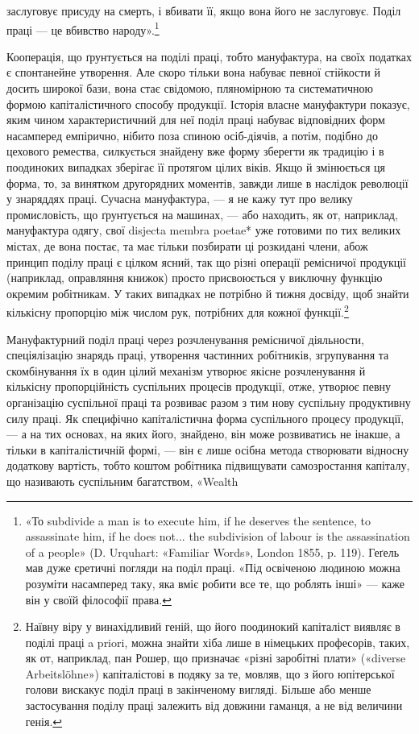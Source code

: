 \parcont{}  %
заслуговує присуду на смерть, і вбивати її, якщо вона його не
заслуговує. Поділ праці — це вбивство народу».\footnote{
«То subdivide a man is to execute him, if he deserves the sentence,
to assassinate him, if he does not... the subdivision of labour is the assassination
of a people» (D. Urquhart: «Familiar Words», London 1855,
p. 119). Геґель мав дуже єретичні погляди на поділ праці. «Під освіченою
людиною можна розуміти насамперед таку, яка вміє робити все
те, що роблять інші» — каже він у своїй філософії права.
}

Кооперація, що ґрунтується на поділі праці, тобто мануфактура,
на своїх податках є спонтанейне утворення. Але скоро
тільки вона набуває певної стійкости й досить широкої бази,
вона стає свідомою, пляномірною та систематичною формою капіталістичного
способу продукції. Історія власне мануфактури
показує, яким чином характеристичний для неї поділ праці
набуває відповідних форм насамперед емпірично, нібито поза
спиною осіб-діячів, а потім, подібно до цехового ремества, силкується
знайдену вже форму зберегти як традицію і в поодиноких
випадках зберігає її протягом цілих віків. Якщо й змінюється
ця форма, то, за винятком другорядних моментів, завжди лише в
наслідок революції у знаряддях праці. Сучасна мануфактура, —
я не кажу тут про велику промисловість, що ґрунтується на
машинах, — або находить, як от, наприклад, мануфактура одягу,
свої disjecta membra poetae* уже готовими по тих великих містах,
де вона постає, та має тільки позбирати ці розкидані члени,
абож принцип поділу праці є цілком ясний, так що різні
операції ремісничої продукції (наприклад, оправляння книжок)
просто присвоюється у виключну функцію окремим робітникам.
У таких випадках не потрібно й тижня досвіду, щоб знайти
кількісну пропорцію між числом рук, потрібних для кожної
функції.\footnote{
Наївну віру у винахідливий геній, що його поодинокий капіталіст
виявляє в поділі праці a priori, можна знайти хіба лише в німецьких
професорів, таких, як от, наприклад, пан Рошер, що призначає «різні
заробітні плати» («diverse Arbeitslöhne») капіталістові в подяку за те,
мовляв, що з його юпітерської голови вискакує поділ праці в закінченому
вигляді. Більше або менше застосування поділу праці залежить від
довжини гаманця, а не від величини генія.
}

Мануфактурний поділ праці через розчленування ремісничої
діяльности, спеціялізацію знарядь праці, утворення частинних
робітників, згрупування та скомбінування їх в один цілий механізм
утворює якісне розчленування й кількісну пропорційність
суспільних процесів продукції, отже, утворює певну організацію
суспільної праці та розвиває разом з тим нову суспільну продуктивну
силу праці. Як специфічно капіталістична форма суспільного
процесу продукції, — а на тих основах, на яких його,
знайдено, він може розвиватись не інакше, а тільки в капіталістичній
формі, — він є лише осібна метода створювати відносну додаткову
вартість, тобто коштом робітника підвищувати самозростання
капіталу, що називають суспільним багатством, «Wealth
\parbreak{}  %
